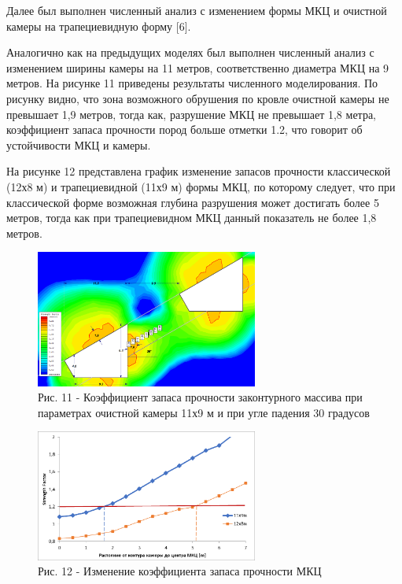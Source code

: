 \begin{multicols}{2}
Далее был выполнен численный анализ с изменением формы МКЦ и очистной
камеры на трапециевидную форму {[}6{]}.

Аналогично как на предыдущих моделях был выполнен численный анализ с
изменением ширины камеры на 11 метров, соответственно диаметра МКЦ на 9
метров. На рисунке 11 приведены результаты численного моделирования. По
рисунку видно, что зона возможного обрушения по кровле очистной камеры
не превышает 1,9 метров, тогда как, разрушение МКЦ не превышает 1,8
метра, коэффициент запаса прочности пород больше отметки 1.2, что
говорит об устойчивости МКЦ и камеры.

На рисунке 12 представлена график изменение запасов прочности
классической (12х8 м) и трапециевидной (11х9 м) формы МКЦ, по которому
следует, что при классической форме возможная глубина разрушения может
достигать более 5 метров, тогда как при трапециевидном МКЦ данный
показатель не более 1,8 метров.
\end{multicols}

\begin{figure}[H]
	\centering
	\includegraphics[width=0.65\textwidth]{assets/291}
	\caption*{Рис. 11 - Коэффициент запаса прочности законтурного массива при
параметрах очистной камеры 11х9 м и при угле падения 30 градусов}
\end{figure}

\begin{figure}[H]
	\centering
	\includegraphics[width=0.65\textwidth]{assets/292}
	\caption*{Рис. 12 - Изменение коэффициента запаса прочности МКЦ}
\end{figure}

